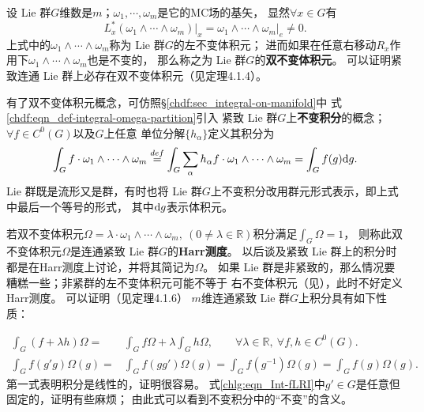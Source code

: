 设 Lie 群$G$维数是$m$；$\omega_1,\cdots,\omega_m$是它的MC场的基矢，
显然$\forall x\in G$有
\begin{equation}
    L_x^* (\omega_1 \wedge\cdots\wedge\omega_m)|_{x} = \left.\omega_1 \wedge\cdots\wedge\omega_m\right|_{e}
    \neq 0.
\end{equation}
上式中的$\omega_1 \wedge\cdots\wedge\omega_m$称为 Lie 群$G$的左不变体积元；
进而如果在任意右移动$R_x$作用下$\omega_1 \wedge\cdots\wedge\omega_m$也是不变的，
那么称之为 Lie 群$G$的\textbf{双不变体积元}。
可以证明紧致连通 Lie 群上必存在双不变体积元（见\parencite[p. 288]{xuyc-2001}定理4.1.4）。


有了双不变体积元概念，可仿照\S\ref{chdf:sec_integral-on-manifold}中
式\eqref{chdf:eqn_def-integral-omega-partition}引入
紧致 Lie 群$G$上\textbf{不变积分}的概念；$\forall f\in C^0(G)$以及$G$上任意
单位分解$\{h_\alpha\}$定义其积分为
\begin{equation}
    \int_{G} f \cdot \omega_1 \wedge\cdots\wedge\omega_m \overset{def}{=} 
    \int_{G} \sum_{\alpha}  h_\alpha f \cdot  \omega_1 \wedge\cdots\wedge\omega_m 
    =\int_{G} f(g) {\rm d}g .
\end{equation}
 Lie 群既是流形又是群，有时也将 Lie 群$G$上不变积分改用群元形式表示，即上式中最后一个等号的形式，
其中${\rm d}g$表示体积元。



若双不变体积元$\Omega=\lambda \cdot \omega_1 \wedge\cdots\wedge\omega_m,\ 
(0\neq\lambda\in \mathbb{R})$积分满足$\int_{G}\Omega {=} 1$，
则称此双不变体积元$\Omega$是连通紧致 Lie 群$G$的\textbf{\bfseries Harr测度}。
以后谈及紧致 Lie 群上的积分时都是在Harr测度上讨论，并将其简记为$\Omega$。
如果 Lie 群是非紧致的，那么情况要糟糕一些；非紧群的左不变体积元可能不等于
右不变体积元（见\parencite[\S 6.1]{Miller-1973}），此时不好定义Harr测度。
可以证明（见\parencite[p.289]{xuyc-2001}定理4.1.6）
$m$维连通紧致 Lie 群$G$上积分具有如下性质：

\begin{align}
    \int_{G} (f+\lambda h) \Omega =& \int_{G} f \Omega +\lambda \int_{G}  h \Omega,
    \qquad \forall \lambda\in \mathbb{R},\  \forall f,h\in C^0(G). \\
    \int_{G} f(g' g) \Omega(g)=& \int_{G} f(g g') \Omega(g)
    = \int_{G} f(g^{-1}) \Omega(g) = \int_{G} f(g) \Omega(g) .
    \label{chlg:eqn_Int-fLRI}
\end{align}
第一式表明积分是线性的，证明很容易。
式\eqref{chlg:eqn_Int-fLRI}中$g'\in G$是任意但固定的，证明有些麻烦；
由此式可以看到不变积分中的“不变”的含义。 


